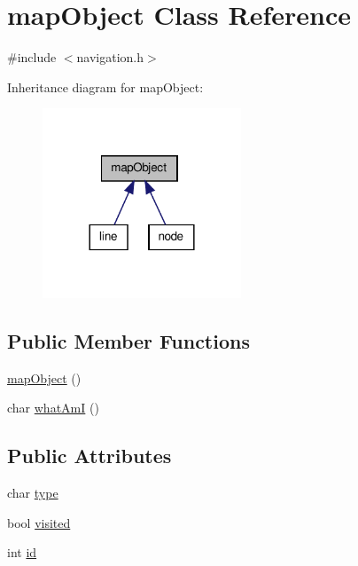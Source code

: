 \hypertarget{classmapObject}{\section{map\-Object \-Class \-Reference}
\label{classmapObject}
}


{\ttfamily \#include $<$navigation.\-h$>$}



\-Inheritance diagram for map\-Object\-:\nopagebreak
\begin{figure}[H]
\begin{center}
\leavevmode
\includegraphics[width=168pt]{classmapObject__inherit__graph}
\end{center}
\end{figure}
\subsection*{\-Public \-Member \-Functions}
\begin{DoxyCompactItemize}
\item 
\hyperlink{classmapObject_a51017921910dea2240a807676ed1e3d2}{map\-Object} ()
\item 
char \hyperlink{classmapObject_aa8c23bfcff8c79b85b774dd701b967f2}{what\-Am\-I} ()
\end{DoxyCompactItemize}
\subsection*{\-Public \-Attributes}
\begin{DoxyCompactItemize}
\item 
char \hyperlink{classmapObject_acb23f5f8b902a799f97d9668f8cad645}{type}
\item 
bool \hyperlink{classmapObject_ac1d84a75e600aa06acebf141ded18976}{visited}
\item 
int \hyperlink{classmapObject_ae1411b40c45164b29cf6116ff3b83a80}{id}
\end{DoxyCompactItemize}
